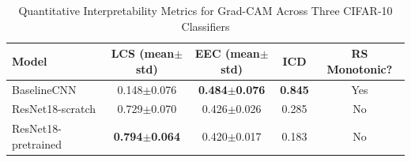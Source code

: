\begin{table}[h]
\centering
\caption{Quantitative Interpretability Metrics for Grad-CAM Across Three CIFAR-10 Classifiers}
\label{tab:xai_metrics}
\begin{tabular}{lcccc}
\hline
\textbf{Model} & \textbf{LCS (mean$\pm$std)} & \textbf{EEC (mean$\pm$std)} & \textbf{ICD} & \textbf{RS Monotonic?} \\
\hline
BaselineCNN & 0.148$\pm$0.076 & \textbf{0.484$\pm$0.076} & \textbf{0.845} & Yes \\
ResNet18-scratch & 0.729$\pm$0.070 & 0.426$\pm$0.026 & 0.285 & No \\
ResNet18-pretrained & \textbf{0.794$\pm$0.064} & 0.420$\pm$0.017 & 0.183 & No \\
\hline
\end{tabular}
\end{table}